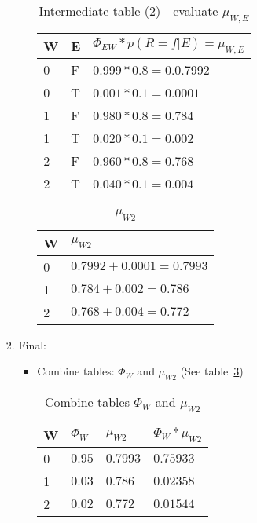 \documentclass{article}
\begin{document}
\begin{enumerate}[label=(\alph*)]
\begin{enumerate}[label=\roman*.]
\begin{enumerate}[label=\alph*.]
\begin{itemize}
\begin{table}[h]
\centering
\caption{Intermediate table (2) - evaluate $\mu_{W,E}$}
\label{table:tbl14}
\begin{tabular}{|l|l|l|}
\hline
 W &E & $\Phi_{EW}*p(R=f|E)=\mu_{W,E}$   \\
\hline \hline
0 & F & $0.999*0.8=0.0.7992$ \\
0 & T & $0.001*0.1=0.0001$ \\
1 & F & $0.980*0.8=0.784$ \\
1 & T & $0.020*0.1=0.002$ \\
2 & F & $0.960*0.8=0.768$ \\
2 & T & $0.040*0.1=0.004$ \\
\hline
\end{tabular}
\end{table}

\begin{table}[h]
\centering
\caption{$\mu_{W2}$}
\label{table:tbl15}
\begin{tabular}{|l|l|}
\hline
 W  & $\mu_{W2}$   \\
\hline \hline
0 & $0.7992+0.0001=0.7993$ \\
1 & $0.784+0.002=0.786$ \\
2 & $0.768+0.004=0.772$ \\
\hline
\end{tabular}
\end{table}

\end{itemize}

\item Final:

\begin{itemize}

\item Combine tables: $\Phi_W$ and $\mu_{W2}$ (See table~\ref{table:tbl16})

\begin{table}[h]
\centering
\caption{Combine tables $\Phi_W$ and $\mu_{W2}$}
\label{table:tbl16}
\begin{tabular}{|l|l|l|l|}
\hline
 W  & $\Phi_W$ & $\mu_{W2}$ &  $\Phi_W * \mu_{W2}$ \\
\hline \hline
0 & $0.95$ & $0.7993$ &  $0.75933$ \\
1 & $0.03$ & $0.786$ & $0.02358$  \\
2 & $0.02$ & $0.772$ & $0.01544$ \\
\hline
\end{tabular}
\end{table}


\end{itemize}
\end{enumerate}
\end{enumerate}
\end{enumerate}
\end{document}
